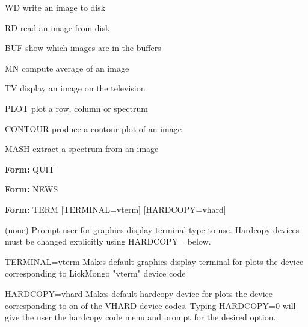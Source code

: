 {\newpage\clearpage
{}%
\begin{example}
   \item[WD\hfill]{write an image to disk}
   \item[RD\hfill]{read an image from disk}
   \item[BUF\hfill]{show which images are in the buffers}
   \item[MN\hfill]{compute average of an image}
   \item[TV\hfill]{display an image on the television}
   \item[PLOT\hfill]{plot a row, column or spectrum}
   \item[CONTOUR\hfill]{produce a contour plot of an image}
   \item[MASH\hfill]{extract a spectrum from an image}
\end{example}%
\lthtmlfigureZ
\lthtmlcheckvsize\clearpage}

{\newpage\clearpage
{}%
\begin{command}
   \item[\textbf{Form: } QUIT\hfill]{}
\end{command}%
\lthtmlfigureZ
\lthtmlcheckvsize\clearpage}

{\newpage\clearpage
{}%
\begin{command}
  \item[\textbf{Form: } NEWS\hfill]{}
\end{command}%
\lthtmlfigureZ
\lthtmlcheckvsize\clearpage}

{\newpage\clearpage
{}%
\begin{command}
   \item[\textbf{Form: } TERM {[TERMINAL=vterm]} {[HARDCOPY=vhard]}\hfill]{}
\par\item[(none)]{Prompt user for graphics display terminal type to use.
        Hardcopy devices must be changed explicitly using HARDCOPY= below.}
\par\item[TERMINAL=vterm]{Makes default graphics display terminal for plots
        the device corresponding to LickMongo "vterm" device code}
\par\item[HARDCOPY=vhard]{Makes default hardcopy device for plots the device
        corresponding to on of the VHARD device codes.  Typing HARDCOPY=0
        will give the user the hardcopy code menu and prompt for the
        desired option.}
\end{command}%
\lthtmlfigureZ
\lthtmlcheckvsize\clearpage}

